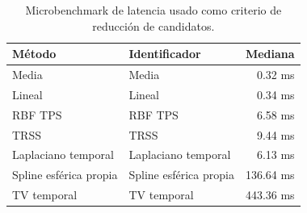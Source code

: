 \begin{table}[htbp]
\centering
\small
\caption{Microbenchmark de latencia usado como criterio de reducción de candidatos.}
\label{tab:ch4_runtime_selection_summary}
\begin{tabular}{@{}p{4.0cm}p{3.3cm}r@{}}
\toprule
Método & Identificador & Mediana \\
\midrule
Media & Media & 0.32 ms \\
Lineal & Lineal & 0.34 ms \\
RBF TPS & RBF TPS & 6.58 ms \\
TRSS & TRSS & 9.44 ms \\
Laplaciano temporal & Laplaciano temporal & 6.13 ms \\
Spline esférica propia & Spline esférica propia & 136.64 ms \\
TV temporal & TV temporal & 443.36 ms \\
\bottomrule
\end{tabular}
\end{table}
